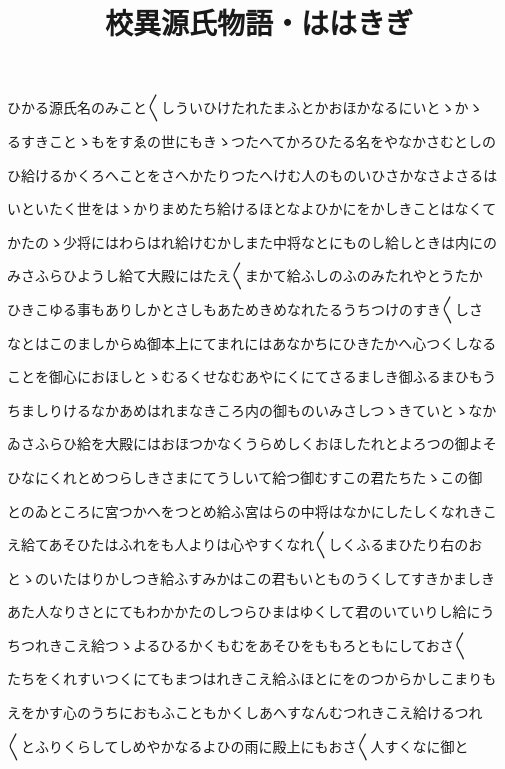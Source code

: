 \documentclass[a4paper,11pt,landscape]{ltjtarticle}
\title{校異源氏物語・ははきぎ}
\date{}
\begin{document}
\maketitle

ひかる源氏名のみこと〱しういひけたれたまふとかおほかなるにいとゝかゝ
\par\medskip
るすきことゝもをすゑの世にもきゝつたへてかろひたる名をやなかさむとしの
\par\medskip
ひ給けるかくろへことをさへかたりつたへけむ人のものいひさかなさよさるは
\par\medskip
いといたく世をはゝかりまめたち給けるほとなよひかにをかしきことはなくて
\par\medskip
かたのゝ少将にはわらはれ給けむかしまた中将なとにものし給しときは内にの
\par\medskip
みさふらひようし給て大殿にはたえ〱まかて給ふしのふのみたれやとうたか
\par\medskip
ひきこゆる事もありしかとさしもあためきめなれたるうちつけのすき〱しさ
\par\medskip
なとはこのましからぬ御本上にてまれにはあなかちにひきたかへ心つくしなる
\par\medskip
ことを御心におほしとゝむるくせなむあやにくにてさるましき御ふるまひもう
\par\medskip
ちましりけるなかあめはれまなきころ内の御ものいみさしつゝきていとゝなか
\par\medskip
ゐさふらひ給を大殿にはおほつかなくうらめしくおほしたれとよろつの御よそ
\par\medskip
ひなにくれとめつらしきさまにてうしいて給つ御むすこの君たちたゝこの御
\par\medskip
とのゐところに宮つかへをつとめ給ふ宮はらの中将はなかにしたしくなれきこ
\par\medskip
え給てあそひたはふれをも人よりは心やすくなれ〱しくふるまひたり右のお
\par\medskip
とゝのいたはりかしつき給ふすみかはこの君もいとものうくしてすきかましき
\par\medskip
あた人なりさとにてもわかかたのしつらひまはゆくして君のいていりし給にう
\par\medskip
ちつれきこえ給つゝよるひるかくもむをあそひをももろともにしておさ〱
\par\medskip
たちをくれすいつくにてもまつはれきこえ給ふほとにをのつからかしこまりも
\par\medskip
えをかす心のうちにおもふこともかくしあへすなんむつれきこえ給けるつれ
\par\medskip
〱とふりくらしてしめやかなるよひの雨に殿上にもおさ〱人すくなに御と
\end{document}
